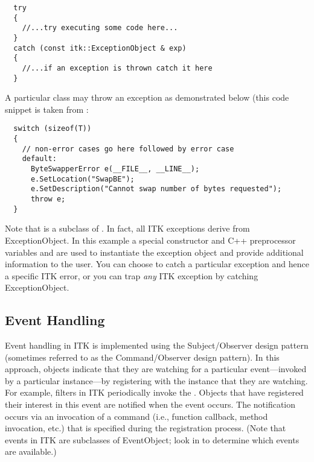 \small
\begin{verbatim}
  try
  {
    //...try executing some code here...
  }
  catch (const itk::ExceptionObject & exp)
  {
    //...if an exception is thrown catch it here
  }
\end{verbatim}
\normalsize

A particular class may throw an exception as demonstrated below (this
code snippet is taken from :

\small
\begin{verbatim}
  switch (sizeof(T))
  {
    // non-error cases go here followed by error case
    default:
      ByteSwapperError e(__FILE__, __LINE__);
      e.SetLocation("SwapBE");
      e.SetDescription("Cannot swap number of bytes requested");
      throw e;
  }
\end{verbatim}
\normalsize

Note that  is a subclass of
. In fact, all ITK exceptions derive
from ExceptionObject. In this example a special constructor and C++
preprocessor variables  and  are used to instantiate
the exception object and provide additional information to the user. You can
choose to catch a particular exception and hence a specific ITK error, or you
can trap \emph{any} ITK exception by catching ExceptionObject.


\subsection{Event Handling}
\label{sec:EventHandling}


Event handling in ITK is implemented using the Subject/Observer design
pattern \cite{Gamma1995} (sometimes referred to as the Command/Observer
design pattern). In this approach, objects indicate that they are watching
for a particular event---invoked by a particular instance---by registering
with the instance that they are watching. For example, filters in ITK
periodically invoke the . Objects that have registered
their interest in this event are notified when the event occurs. The
notification occurs via an invocation of a command (i.e., function callback,
method invocation, etc.) that is specified during the registration
process. (Note that events in ITK are subclasses of EventObject; look
in  to determine which events are available.)

